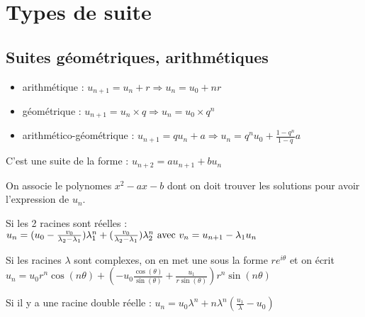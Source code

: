 \documentclass[french]{yLectureNote}
\begin{document}
\section{Types de suite}
\subsection{Suites géométriques, arithmétiques}
\begin{definition}
\begin{itemize}
 \item arithmétique : $u_{n+1} = u_n + r \Rightarrow u_n = u_0+nr$
 \item géométrique : $u_{n+1} = u_n \times q \Rightarrow u_n = u_0\times q^n$
 \item arithmético-géométrique : $u_{n+1} = q u_n +a \Rightarrow u_n = q^n u_0 + \frac{1-q^n}{1-q}a$
\end{itemize}
\end{definition}
\begin{definition}
C'est une suite de la forme : $u_{n+2} = au_{n+1} + bu_{n}$

On associe le polynomes $x^2-ax-b$ dont on doit trouver les solutions pour avoir l'expression de $u_n$.
\end{definition}
\begin{theorem}
Si les 2 racines  sont réelles : \(u_n = (u_0-\frac{v_0}{\lambda_2-\lambda_1})\lambda_1^n+(\frac{v_0}{\lambda_2-\lambda_1})\lambda_2^n$ avec $v_n = u_{n+1}-\lambda_1u_n\)

Si les racines $\lambda$ sont complexes, on en met une sous la forme $re^{i\theta}$ et on écrit $u_n = u_0 r^n \cos(n\theta)+(-u_0\frac{\cos(\theta)}{\sin(\theta)} + \frac{u_1}{r\sin(\theta)}) r^n \sin(n\theta)$

Si il y a une racine double réelle : $u_n = u_0\lambda^n + n\lambda^n(\frac{u_1}{\lambda}-u_0)$
\end{theorem}
\end{document}
